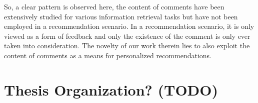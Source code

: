 So, a clear pattern is observed here, the content of comments have been extensively studied for various information retrieval tasks but have not been employed in a recommendation scenario. In a recommendation scenario, it is only viewed as a form of feedback and only the existence of the comment is only ever taken into consideration. The novelty of our work therein lies to also exploit the content of comments as a means for personalized recommendations.

\section{Thesis Organization? (TODO)}